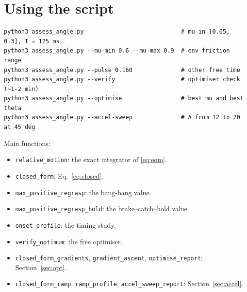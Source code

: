 \documentclass[11pt,a4paper]{article}
\newcommand{\code}[1]{\texttt{#1}}
\begin{document}
\section{Using the script}
\begin{verbatim}
python3 assess_angle.py                            # mu in [0.05, 0.3], T = 125 ms
python3 assess_angle.py --mu-min 0.6 --mu-max 0.9  # env friction range
python3 assess_angle.py --pulse 0.160              # other free time
python3 assess_angle.py --verify                   # optimiser check (~1-2 min)
python3 assess_angle.py --optimise                 # best mu and best theta
python3 assess_angle.py --accel-sweep              # A from 12 to 20 at 45 deg
\end{verbatim}
Main functions:
\begin{itemize}
  \item \code{relative\_motion}: the exact integrator of \eqref{eq:eom}.
  \item \code{closed\_form}: Eq.~\eqref{eq:closed}.
  \item \code{max\_positive\_regrasp}: the bang-bang value.
  \item \code{max\_positive\_regrasp\_hold}: the brake--catch--hold value.
  \item \code{onset\_profile}: the timing study.
  \item \code{verify\_optimum}: the free optimiser.
  \item \code{closed\_form\_gradients}, \code{gradient\_ascent}, \code{optimise\_report}: Section~\ref{sec:opt}.
  \item \code{closed\_form\_ramp}, \code{ramp\_profile}, \code{accel\_sweep\_report}: Section~\ref{sec:accel}.
\end{itemize}
\end{document}
